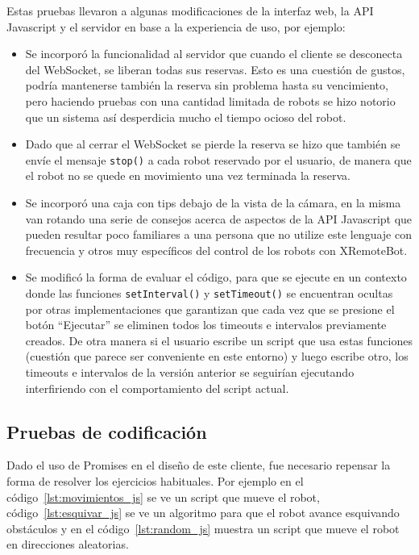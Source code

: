 Estas pruebas llevaron a algunas modificaciones de la interfaz
web, la API Javascript y el servidor en base a la experiencia de uso,
por ejemplo:
\begin{itemize}
    \item Se incorporó la funcionalidad al servidor que cuando
        el cliente se desconecta del WebSocket, se liberan todas
        sus reservas. Esto es una cuestión de gustos, podría
        mantenerse también la reserva sin problema hasta su
        vencimiento, pero haciendo pruebas con una cantidad
        limitada de robots se hizo notorio que un sistema
        así desperdicia mucho el tiempo ocioso del robot.
    \item Dado que al cerrar el WebSocket se pierde la reserva
        se hizo que también se envíe el mensaje \texttt{stop()}
        a cada robot reservado por el usuario, de manera
        que el robot no se quede en movimiento una vez
        terminada la reserva.
    \item Se incorporó una caja con tips debajo de la vista de
        la cámara, en la misma van rotando una serie de consejos
        acerca de aspectos de la API Javascript que pueden
        resultar poco familiares a una persona que no utilize este
        lenguaje con frecuencia y otros muy específicos
        del control de los robots con XRemoteBot.
    \item Se modificó la forma de evaluar el código, para que se
        ejecute en un contexto donde las funciones
        \texttt{setInterval()} y \texttt{setTimeout()} se encuentran
        ocultas por otras implementaciones que garantizan que cada
        vez que se presione el botón ``Ejecutar'' se eliminen
        todos los timeouts e intervalos previamente creados.
        De otra manera si el usuario escribe un script que usa
        estas funciones
        (cuestión que parece ser conveniente en este entorno)
        y luego escribe otro, los timeouts e intervalos
        de la versión anterior se seguirían ejecutando
        interfiriendo con el comportamiento del script actual.
\end{itemize}

\subsection{Pruebas de codificación}

Dado el uso de Promises en el diseño de este cliente, fue
necesario repensar la forma
de resolver los ejercicios habituales. Por ejemplo en el
código~\ref{lst:movimientos_js} se ve un script que mueve el
robot,
código~\ref{lst:esquivar_js} se ve un algoritmo para que el robot
avance esquivando obstáculos y en el código~\ref{lst:random_js}
muestra un script que mueve el robot en direcciones aleatorias.

